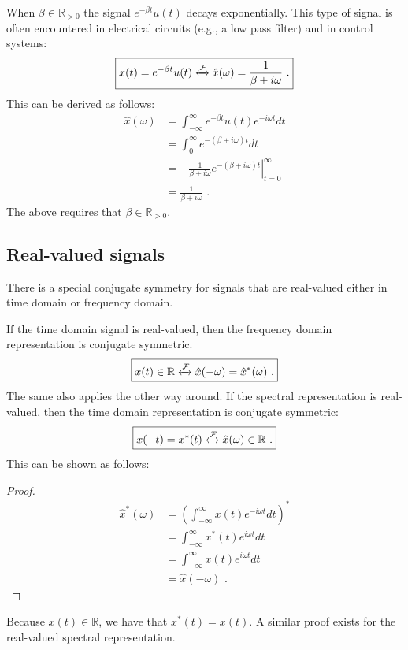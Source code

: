 When $\beta \in \mathbb{R}_{>0}$ the signal $e^{-\beta t} u(t)$ decays exponentially. 
This type of signal is often encountered in electrical circuits (e.g., a low pass filter) and in control systems:
\begin{equation}
\boxed{x(t)=e^{-\beta t} u(t) \xleftrightarrow{\mathcal{F}} \hat{x}(\omega)=\frac{1}{\beta + i\omega}\,\,.}
\end{equation}
This can be derived as follows:
\begin{align}
\hat{x}(\omega) &= \int_{-\infty}^{\infty} e^{-\beta t} u(t) e^{-i\omega t}dt \\
&= \int_{0}^{\infty} e^{-(\beta+i\omega) t} dt \\
&= \left. -\frac{1}{\beta + i\omega} e^{-(\beta + i\omega)t} \right|_{t=0}^{\infty}\\
&= \frac{1}{\beta + i\omega}\,\,.
\end{align}
The above requires that $\beta \in \mathbb{R}_{> 0}$.

\subsection{Real-valued signals}
There is a special conjugate symmetry for signals that are real-valued either in time domain or frequency domain. 

If the time domain signal is real-valued, then the frequency domain representation is conjugate symmetric.
\begin{equation}
\boxed{
x(t) \in \mathbb{R} \xleftrightarrow{\mathcal{F}} \hat{x}(-\omega)=\hat{x}^*(\omega)\,\,.
}
\end{equation}
The same also applies the other way around. If the spectral representation is real-valued, then the time domain representation is conjugate symmetric:
\begin{equation}
\boxed{
x(-t)=x^*(t) \xleftrightarrow{\mathcal{F}} \hat{x}(\omega) \in \mathbb{R}\,\,.
}
\end{equation}
This can be shown as follows:
\begin{proof}
\begin{align}
\hat{x}^*(\omega) &= \left(\int_{-\infty}^{\infty} x(t) e^{-i\omega t}dt\right)^* \\
 &= \int_{-\infty}^{\infty} x^*(t) e^{i\omega t}dt \\
 &= \int_{-\infty}^{\infty} x(t) e^{i\omega t}dt \\
 &= \hat{x}(-\omega)\,\,.
\end{align}
\end{proof}
Because $x(t)\in\mathbb{R}$, we have that $x^*(t)=x(t)$. A similar proof exists for the real-valued spectral representation. 

